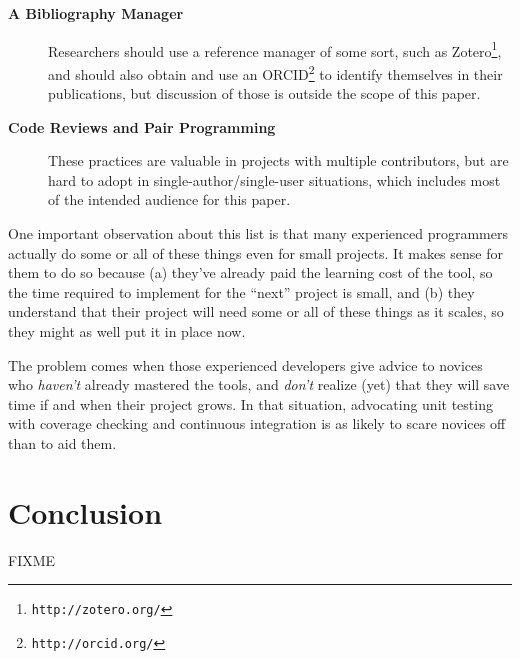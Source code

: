 \documentclass[10pt]{article}
\newcommand{\withurl}[2]{{#1}\footnote{\texttt{#2}}}
\begin{document}
\begin{description}
\item[\textbf{A Bibliography Manager}] Researchers should use a
  reference manager of some sort, such as
  \withurl{Zotero}{http://zotero.org/}, and should also obtain and use an
  \withurl{ORCID}{http://orcid.org/} to identify themselves in their
  publications, but discussion of those is outside the scope of this
  paper.

\item[\textbf{Code Reviews and Pair Programming}]
These practices are valuable in projects with multiple contributors, but
are hard to adopt in single-author/single-user situations, which
includes most of the intended audience for this paper.

\end{description}

One important observation about this list is that many experienced
programmers actually do some or all of these things even for small
projects. It makes sense for them to do so because (a) they've already
paid the learning cost of the tool, so the time required to implement
for the ``next'' project is small, and (b) they understand that their
project will need some or all of these things as it scales, so they
might as well put it in place now.

The problem comes when those experienced developers give advice to
novices who \emph{haven't} already mastered the tools, and \emph{don't}
realize (yet) that they will save time if and when their project grows.
In that situation, advocating unit testing with coverage checking and
continuous integration is as likely to scare novices off than to aid
them.

\section{Conclusion}\label{conclusion}

FIXME


\end{document}
